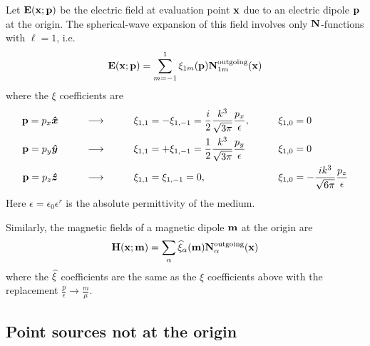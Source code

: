 \documentclass[letterpaper]{article}
\begin{document}
Let $\mathbf{E}(\mathbf{x}; \mathbf{p})$ be the electric field
at evaluation point $\mathbf{x}$ due to an electric dipole
$\mathbf{p}$ at the origin. The spherical-wave expansion
of this field involves only $\mathbf{N}$-functions
with $\ell=1$, i.e.
$$ \mathbf{E}(\mathbf{x}; \mathbf{p}) = 
   \sum_{m=-1}^1 \xi_{1m}(\mathbf{p}) \mathbf{N}_{1m}^{\text{\scriptsize outgoing}}(\mathbf{x})
$$
where the $\xi$ coefficients are
$$\begin{array}{clll}
\mathbf{p}=p_x \boldsymbol{\hat{x}}
&\qquad\longrightarrow\qquad
&\displaystyle{
  \xi_{1,1}=-\xi_{1,-1}=\frac{i}{2}\frac{k^3}{\sqrt{3\pi}}\frac{p_x}{\epsilon},
              }
&\qquad\xi_{1,0}=0
\\[10pt]
\mathbf{p}=p_y \boldsymbol{\hat{y}}
&\qquad\longrightarrow\qquad
&\displaystyle{
 \xi_{1,1}=+\xi_{1,-1}=\frac{1}{2}\frac{k^3}{\sqrt{3\pi}}\frac{p_y}{\epsilon}
              }
&\qquad\xi_{1,0}=0
\\[10pt]
\mathbf{p}=p_z \boldsymbol{\hat{z}}
&\qquad\longrightarrow\qquad
&\displaystyle{
 \xi_{1,1}=\xi_{1,-1}=0, 
              } 
&\qquad \xi_{1,0} = 
  \displaystyle{ -\frac{ik^3}{\sqrt{6\pi}} \frac{p_z}{\epsilon} }
\end{array}$$
Here $\epsilon=\epsilon_0\epsilon^r$ is the absolute permittivity
of the medium.

Similarly, the magnetic fields of a magnetic dipole $\mathbf{m}$ at the
origin are
$$ \mathbf{H}(\mathbf{x}; \mathbf{m})=\sum_\alpha \widehat{\xi}_\alpha(\mathbf{m}) \mathbf{N}^{\text{\scriptsize outgoing}}_\alpha(\mathbf{x})
$$
where the $\widehat{\xi}$ coefficients are the same as the
$\xi$ coefficients above with the replacement
$\frac{p}{\epsilon} \to \frac{m}{\mu}.$

\subsection{Point sources not at the origin}
\label{PointSourceSection}
\end{document}
